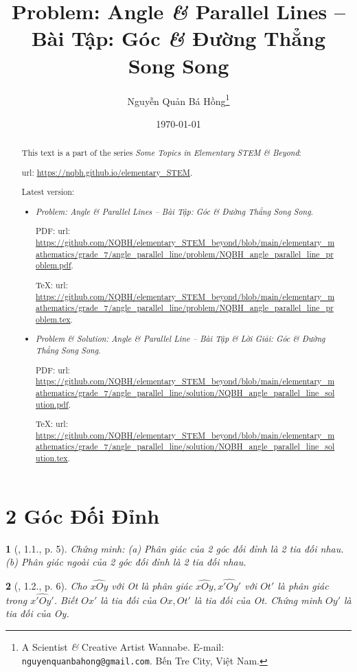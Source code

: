\documentclass{article}
\title{Problem: Angle {\it\&} Parallel Lines -- Bài Tập: Góc {\it\&} Đường Thẳng Song Song}
\author{Nguyễn Quản Bá Hồng\footnote{A Scientist {\it\&} Creative Artist Wannabe. E-mail: {\tt nguyenquanbahong@gmail.com}. Bến Tre City, Việt Nam.}}
\date{\today}
\newtheorem{baitoan}{}
\begin{document}
\maketitle
\begin{abstract}
	This text is a part of the series {\it Some Topics in Elementary STEM \& Beyond}:
	
	{\sc url}: \url{https://nqbh.github.io/elementary_STEM}.
	
	Latest version:
	\begin{itemize}
		\item {\it Problem: Angle \& Parallel Lines -- Bài Tập: Góc \& Đường Thẳng Song Song}.
		
		PDF: {\sc url}: \url{https://github.com/NQBH/elementary_STEM_beyond/blob/main/elementary_mathematics/grade_7/angle_parallel_line/problem/NQBH_angle_parallel_line_problem.pdf}.
		
		\TeX: {\sc url}: \url{https://github.com/NQBH/elementary_STEM_beyond/blob/main/elementary_mathematics/grade_7/angle_parallel_line/problem/NQBH_angle_parallel_line_problem.tex}.
		\item {\it Problem \& Solution: Angle \& Parallel Line -- Bài Tập \& Lời Giải: Góc \& Đường Thẳng Song Song}.
		
		PDF: {\sc url}: \url{https://github.com/NQBH/elementary_STEM_beyond/blob/main/elementary_mathematics/grade_7/angle_parallel_line/solution/NQBH_angle_parallel_line_solution.pdf}.
		
		\TeX: {\sc url}: \url{https://github.com/NQBH/elementary_STEM_beyond/blob/main/elementary_mathematics/grade_7/angle_parallel_line/solution/NQBH_angle_parallel_line_solution.tex}.
	\end{itemize}
\end{abstract}
\tableofcontents


\section{2 Góc Đối Đỉnh}

\begin{baitoan}[\cite{Hung_Mai_Toan_7_hinh_hoc}, 1.1., p. 5]
	Chứng minh: (a) Phân giác của 2 góc đối đỉnh là 2 tia đối nhau. (b) Phân giác ngoài của 2 góc đối đỉnh là 2 tia đối nhau.
\end{baitoan}

\begin{baitoan}[\cite{Hung_Mai_Toan_7_hinh_hoc}, 1.2., p. 6]
	Cho $\widehat{xOy}$ với Ot là phân giác $\widehat{xOy},\widehat{x'Oy'}$ với $Ot'$ là phân giác trong $\widehat{x'Oy'}$. Biết $Ox'$ là tia đối của $Ox,Ot'$ là tia đối của Ot. Chứng minh $Oy'$ là tia đối của Oy.
\end{baitoan}
\end{document}
